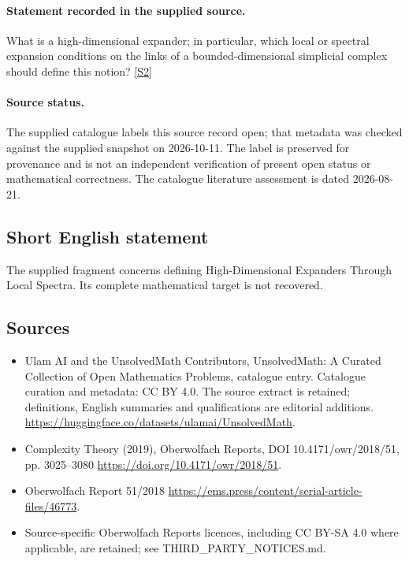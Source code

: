 \documentclass[11pt]{article}
\newcommand{\sref}[2]{\hyperlink{source:#1:#2}{[S#2]}}
\begin{document}
\paragraph{Statement recorded in the supplied source.}
What is a high-dimensional expander; in particular, which local or spectral expansion conditions on the links of a bounded-dimensional simplicial complex should define this notion? \sref{statement}{2}
\paragraph{Source status.}
The supplied catalogue labels this source record open; that metadata was checked against the supplied snapshot on 2026-10-11. The label is preserved for provenance and is not an independent verification of present open status or mathematical correctness. The catalogue literature assessment is dated 2026-08-21.
\subsection{Short English statement}
The supplied fragment concerns defining High-Dimensional Expanders Through Local Spectra. Its complete mathematical target is not recovered.
\subsection{Sources}
\begin{itemize}
\item[\hypertarget{source:statement:1}{S1}] Ulam AI and the UnsolvedMath Contributors, UnsolvedMath: A Curated Collection of Open Mathematics Problems, catalogue entry. Catalogue curation and metadata: CC BY 4.0. The source extract is retained; definitions, English summaries and qualifications are editorial additions.
\url{https://huggingface.co/datasets/ulamai/UnsolvedMath}.
\item[\hypertarget{source:statement:2}{S2}] Complexity Theory (2019), Oberwolfach Reports, DOI 10.4171/owr/2018/51, pp. 3025--3080
\url{https://doi.org/10.4171/owr/2018/51}.
\item[\hypertarget{source:statement:3}{S3}] Oberwolfach Report 51/2018
\url{https://ems.press/content/serial-article-files/46773}.
\item Source-specific Oberwolfach Reports licences, including CC BY-SA 4.0 where applicable, are retained; see THIRD\_PARTY\_NOTICES.md.
\end{itemize}
\end{document}
